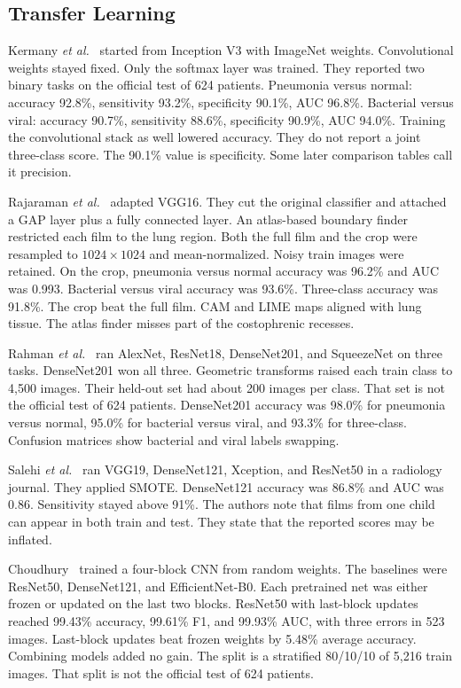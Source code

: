 \documentclass[conference]{IEEEtran}
\begin{document}
\subsection{Transfer Learning}
Kermany \textit{et al.}~\cite{kermany2018} started from Inception V3 with ImageNet weights. Convolutional weights stayed fixed. Only the softmax layer was trained. They reported two binary tasks on the official test of 624 patients. Pneumonia versus normal: accuracy 92.8\%, sensitivity 93.2\%, specificity 90.1\%, AUC 96.8\%. Bacterial versus viral: accuracy 90.7\%, sensitivity 88.6\%, specificity 90.9\%, AUC 94.0\%. Training the convolutional stack as well lowered accuracy. They do not report a joint three-class score. The 90.1\% value is specificity. Some later comparison tables call it precision.

Rajaraman \textit{et al.}~\cite{rajaraman2018} adapted VGG16. They cut the original classifier and attached a GAP layer plus a fully connected layer. An atlas-based boundary finder restricted each film to the lung region. Both the full film and the crop were resampled to $1024\times 1024$ and mean-normalized. Noisy train images were retained. On the crop, pneumonia versus normal accuracy was 96.2\% and AUC was 0.993. Bacterial versus viral accuracy was 93.6\%. Three-class accuracy was 91.8\%. The crop beat the full film. CAM and LIME maps aligned with lung tissue. The atlas finder misses part of the costophrenic recesses.

Rahman \textit{et al.}~\cite{rahman2020} ran AlexNet, ResNet18, DenseNet201, and SqueezeNet on three tasks. DenseNet201 won all three. Geometric transforms raised each train class to 4{,}500 images. Their held-out set had about 200 images per class. That set is not the official test of 624 patients. DenseNet201 accuracy was 98.0\% for pneumonia versus normal, 95.0\% for bacterial versus viral, and 93.3\% for three-class. Confusion matrices show bacterial and viral labels swapping.

Salehi \textit{et al.}~\cite{salehi2021} ran VGG19, DenseNet121, Xception, and ResNet50 in a radiology journal. They applied SMOTE. DenseNet121 accuracy was 86.8\% and AUC was 0.86. Sensitivity stayed above 91\%. The authors note that films from one child can appear in both train and test. They state that the reported scores may be inflated.

Choudhury~\cite{choudhury2026} trained a four-block CNN from random weights. The baselines were ResNet50, DenseNet121, and EfficientNet-B0. Each pretrained net was either frozen or updated on the last two blocks. ResNet50 with last-block updates reached 99.43\% accuracy, 99.61\% F1, and 99.93\% AUC, with three errors in 523 images. Last-block updates beat frozen weights by 5.48\% average accuracy. Combining models added no gain. The split is a stratified 80/10/10 of 5{,}216 train images. That split is not the official test of 624 patients.
\end{document}
